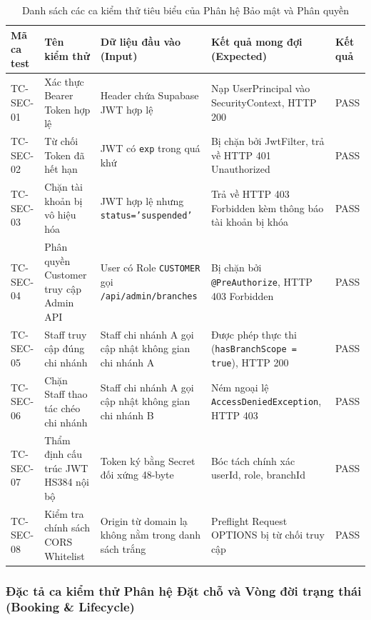 \begin{table}[H]
\centering
\caption{Danh sách các ca kiểm thử tiêu biểu của Phân hệ Bảo mật và Phân quyền}
\label{tab:tc-security}
\renewcommand{\arraystretch}{1.25}
\begin{tabular}{|p{2.2cm}|p{3.5cm}|p{3.5cm}|p{4.2cm}|p{1.2cm}|}
\hline
\textbf{Mã ca test} & \textbf{Tên kiểm thử} & \textbf{Dữ liệu đầu vào (Input)} & \textbf{Kết quả mong đợi (Expected)} & \textbf{Kết quả} \\
\hline
TC-SEC-01 & Xác thực Bearer Token hợp lệ & Header chứa Supabase JWT hợp lệ & Nạp UserPrincipal vào SecurityContext, HTTP 200 & PASS \\
\hline
TC-SEC-02 & Từ chối Token đã hết hạn & JWT có \texttt{exp} trong quá khứ & Bị chặn bởi JwtFilter, trả về HTTP 401 Unauthorized & PASS \\
\hline
TC-SEC-03 & Chặn tài khoản bị vô hiệu hóa & JWT hợp lệ nhưng \texttt{status='suspended'} & Trả về HTTP 403 Forbidden kèm thông báo tài khoản bị khóa & PASS \\
\hline
TC-SEC-04 & Phân quyền Customer truy cập Admin API & User có Role \texttt{CUSTOMER} gọi \texttt{/api/admin/branches} & Bị chặn bởi \texttt{@PreAuthorize}, HTTP 403 Forbidden & PASS \\
\hline
TC-SEC-05 & Staff truy cập đúng chi nhánh & Staff chi nhánh A gọi cập nhật không gian chi nhánh A & Được phép thực thi (\texttt{hasBranchScope = true}), HTTP 200 & PASS \\
\hline
TC-SEC-06 & Chặn Staff thao tác chéo chi nhánh & Staff chi nhánh A gọi cập nhật không gian chi nhánh B & Ném ngoại lệ \texttt{AccessDeniedException}, HTTP 403 & PASS \\
\hline
TC-SEC-07 & Thẩm định cấu trúc JWT HS384 nội bộ & Token ký bằng Secret đối xứng 48-byte & Bóc tách chính xác userId, role, branchId & PASS \\
\hline
TC-SEC-08 & Kiểm tra chính sách CORS Whitelist & Origin từ domain lạ không nằm trong danh sách trắng & Preflight Request OPTIONS bị từ chối truy cập & PASS \\
\hline
\end{tabular}
\end{table}

\subsubsection{Đặc tả ca kiểm thử Phân hệ Đặt chỗ và Vòng đời trạng thái (Booking \& Lifecycle)}

